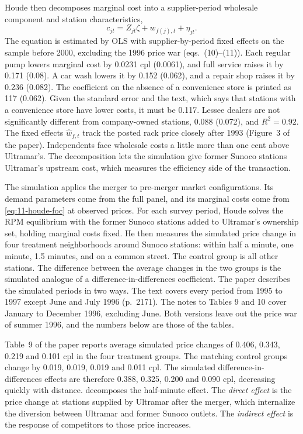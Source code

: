 Houde then decomposes marginal cost into a supplier-period wholesale component and station characteristics,
\begin{equation}\label{eq:11-houde-cost}
c_{jt} = Z_{jt}\zeta + w_{f(j),t} + \eta_{jt}.
\end{equation}
The equation is estimated by OLS with supplier-by-period fixed effects on the sample before 2000, excluding the 1996
price war (eqs.~(10)--(11)). Each regular pump lowers marginal cost by 0.0231 cpl (0.0061), and full service raises it by 0.171
(0.08). A car wash lowers it by 0.152 (0.062), and a repair shop raises it by 0.236 (0.082). The coefficient on the absence of a
convenience store is printed as 117 (0.062). Given the standard error and the text, which says that stations with a
convenience store have lower costs, it must be 0.117.
Lessee dealers are not significantly different from company-owned stations, 0.088 (0.072), and $R^2 = 0.92$. The
fixed effects $\hat w_{f,t}$ track the posted rack price closely after 1993 (Figure~3 of the paper). Independents
face wholesale costs a little more than one cent above Ultramar's. The decomposition lets the simulation give former
Sunoco stations Ultramar's upstream cost, which measures the efficiency side of the transaction.

The simulation applies the merger to pre-merger market configurations. Its demand parameters come from the full
panel, and its marginal costs come from \eqref{eq:11-houde-foc} at observed prices. For each survey period, Houde
solves the RPM equilibrium with the former Sunoco stations added to Ultramar's ownership set, holding marginal
costs fixed. He then
measures the simulated price change in four treatment neighborhoods around Sunoco stations: within half a minute,
one minute, 1.5 minutes, and on a common street. The control group is all other stations. The difference between the
average changes in the two groups is the simulated analogue of a difference-in-differences coefficient. The paper
describes the simulated periods in two ways. The text covers every period from 1995 to 1997 except June and July 1996
(p.~2171). The notes to Tables 9 and 10 cover January to December 1996, excluding June. Both versions leave out the
price war of summer 1996, and the numbers below are those of the tables.

Table~9 of the paper reports average simulated price changes of 0.406, 0.343, 0.219 and 0.101 cpl in the four
treatment groups. The matching control groups change by 0.019, 0.019, 0.019 and 0.011 cpl. The simulated
difference-in-differences effects are therefore 0.388, 0.325, 0.200 and 0.090 cpl, decreasing quickly with distance.
 decomposes the half-minute effect. The \emph{direct effect} is the price change at stations
supplied by Ultramar after the merger, which internalize the diversion between Ultramar and former Sunoco outlets.
The \emph{indirect effect} is the response of competitors to those price increases.

